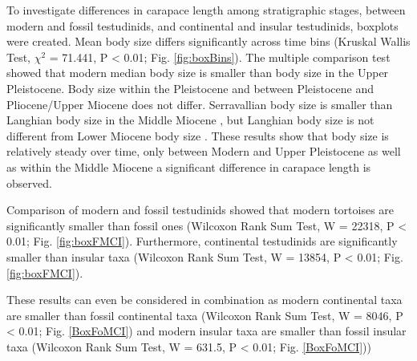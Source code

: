 \FloatBarrier



To investigate differences in carapace length among stratigraphic stages, between modern and fossil testudinids, and continental and insular testudinids, boxplots were created.
Mean body size differs significantly across time bins (Kruskal Wallis Test, $\chi^2$ = 71.441, P < 0.01; Fig. \ref{fig:boxBins}). 
The multiple comparison test showed that modern median body size is smaller than body size in the Upper Pleistocene. %
Body size within the Pleistocene and between Pleistocene and Pliocene/Upper Miocene does not differ.
Serravallian body size is smaller than Langhian body size in the Middle Miocene%
, but Langhian body size is not different from Lower Miocene body size%
.
These results show that body size is relatively steady over time, only between Modern and Upper Pleistocene as well as within the Middle Miocene a significant difference in carapace length is observed. 


Comparison of modern and fossil testudinids showed that modern tortoises are significantly smaller than fossil ones (Wilcoxon Rank Sum Test, W = 22318, P < 0.01; Fig. \ref{fig:boxFMCI}). Furthermore, continental testudinids are significantly smaller than insular taxa (Wilcoxon Rank Sum Test, W = 13854, P < 0.01; Fig. \ref{fig:boxFMCI}).


These results can even be considered in combination as modern continental taxa are smaller than fossil continental taxa (Wilcoxon Rank Sum Test, W = 8046, P < 0.01; Fig. \ref{BoxFoMCI}) and modern insular taxa are smaller than fossil insular taxa (Wilcoxon Rank Sum Test, W = 631.5, P < 0.01; Fig. \ref{BoxFoMCI}))



